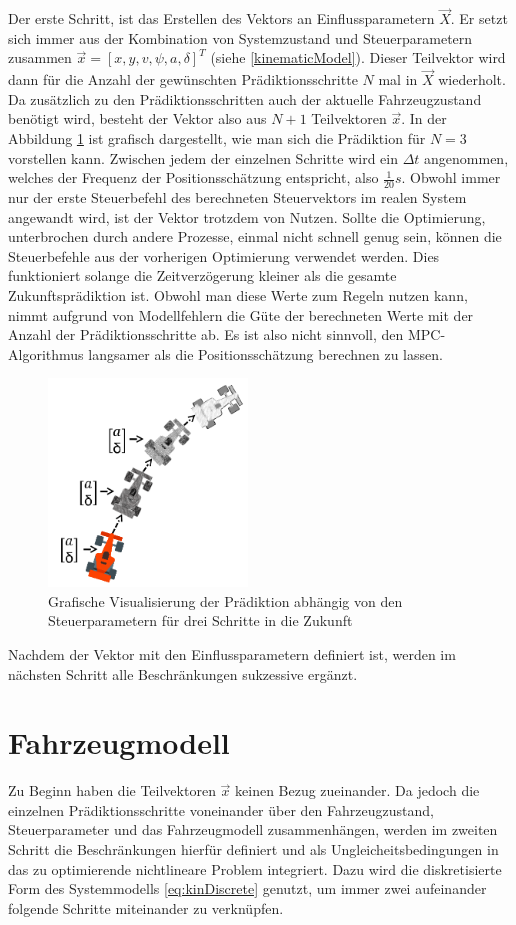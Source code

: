 \documentclass{like}
\begin{document}
Der erste Schritt, ist das Erstellen des Vektors an Einflussparametern $\vec{X}$. Er setzt sich immer aus der Kombination von Systemzustand und Steuerparametern zusammen  $\vec{x} = [x, y, v, \psi, a, \delta ]^T $ (siehe \ref{kinematicModel}). 
Dieser Teilvektor wird dann für die Anzahl der gewünschten Prädiktionsschritte \(N\) mal in $\vec{X}$ wiederholt. Da zusätzlich zu den Prädiktionsschritten auch der aktuelle Fahrzeugzustand benötigt wird, besteht der Vektor also aus $N+1$ Teilvektoren $\vec{x}$. In der Abbildung \ref{fig:predictionMpc} ist grafisch dargestellt, wie man sich die Prädiktion für $N=3$ vorstellen kann. Zwischen jedem der einzelnen Schritte wird ein $\Delta t$ angenommen, welches der Frequenz der Positionsschätzung entspricht, also $\frac{1}{20} s$. Obwohl immer nur der erste Steuerbefehl des berechneten Steuervektors im realen System angewandt wird, ist der Vektor trotzdem von Nutzen. Sollte die Optimierung, unterbrochen durch andere Prozesse, einmal nicht schnell genug sein, können die Steuerbefehle aus der vorherigen Optimierung verwendet werden. Dies funktioniert solange die Zeitverzögerung kleiner als die gesamte Zukunftsprädiktion ist. Obwohl man diese Werte zum Regeln nutzen kann, nimmt aufgrund von Modellfehlern die Güte der berechneten Werte mit der Anzahl der Prädiktionsschritte ab. Es ist also nicht sinnvoll, den \ac{MPC}-Algorithmus langsamer als die Positionsschätzung berechnen zu lassen. 

  
\begin{figure}[ht!]
	\centering
	\includegraphics[width=150pt]{Abbildungen/prediction.png}
	\caption{Grafische Visualisierung der Prädiktion abhängig von den Steuerparametern für drei Schritte in die Zukunft}
	\label{fig:predictionMpc}
\end{figure}
Nachdem der Vektor mit den Einflussparametern definiert ist, werden im nächsten Schritt alle Beschränkungen sukzessive ergänzt.

\section{Fahrzeugmodell}
Zu Beginn haben die Teilvektoren $\vec{x}$ keinen Bezug zueinander. Da jedoch die einzelnen Prädiktionsschritte voneinander über den Fahrzeugzustand, Steuerparameter und das Fahrzeugmodell zusammenhängen, werden im zweiten Schritt die Beschränkungen hierfür definiert und als Ungleicheitsbedingungen in das zu optimierende nichtlineare Problem integriert. Dazu wird die diskretisierte Form des Systemmodells \eqref{eq:kinDiscrete} genutzt, um immer zwei aufeinander folgende Schritte miteinander zu verknüpfen. 
\end{document}

